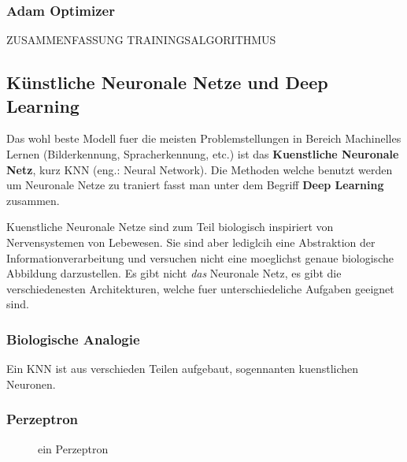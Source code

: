 \documentclass[../main]{subfiles}
\begin{document}
\subsubsection{Adam Optimizer}
ZUSAMMENFASSUNG TRAININGSALGORITHMUS

\subsection{Künstliche Neuronale Netze und Deep Learning}
Das wohl beste Modell fuer die meisten Problemstellungen in Bereich Machinelles Lernen (Bilderkennung, Spracherkennung, etc.) ist das \textbf{Kuenstliche Neuronale Netz}, kurz KNN (eng.: Neural Network).
Die Methoden welche benutzt werden um Neuronale Netze zu traniert fasst man unter dem Begriff \textbf{Deep Learning} zusammen.

Kuenstliche Neuronale Netze sind zum Teil biologisch inspiriert von Nervensystemen von Lebewesen. Sie sind aber lediglcih eine Abstraktion der Informationverarbeitung und versuchen nicht eine moeglichst genaue biologische Abbildung darzustellen.
Es gibt nicht \textit{das} Neuronale Netz, es gibt die verschiedenesten Architekturen, welche fuer unterschiedeliche Aufgaben geeignet sind.

\subsubsection{Biologische Analogie}

Ein KNN ist aus verschieden Teilen aufgebaut, sogennanten kuenstlichen Neuronen.

\subsubsection{Perzeptron}
\begin{figure}[h!]
    \centering
    \caption{ein Perzeptron}

\end{figure}
\end{document}
